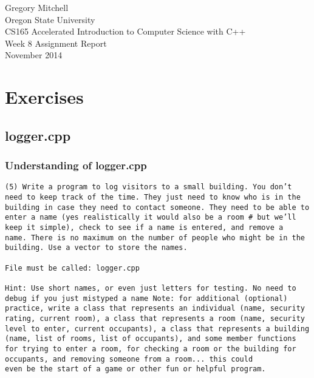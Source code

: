 \documentclass[11pt, oneside]{memoir}
\begin{document}

\begin{center}
  
{\Huge Gregory Mitchell \\
Oregon State University \\ 
CS165 Accelerated Introduction to Computer Science with C++ \\
Week 8 Assignment Report\\
November 2014}
\end{center}
\newpage


\setcounter{tocdepth}{8}
\tableofcontents %
\vspace*{1cm}



\chapter{Exercises}

\section{logger.cpp}

\subsection{Understanding of logger.cpp}

\begin{verbatim}
(5) Write a program to log visitors to a small building. You don’t
need to keep track of the time. They just need to know who is in the
building in case they need to contact someone. They need to be able to
enter a name (yes realistically it would also be a room # but we’ll
keep it simple), check to see if a name is entered, and remove a
name. There is no maximum on the number of people who might be in the
building. Use a vector to store the names.

File must be called: logger.cpp

Hint: Use short names, or even just letters for testing. No need to
debug if you just mistyped a name Note: for additional (optional)
practice, write a class that represents an individual (name, security
rating, current room), a class that represents a room (name, security
level to enter, current occupants), a class that represents a building
(name, list of rooms, list of occupants), and some member functions
for trying to enter a room, for checking a room or the building for
occupants, and removing someone from a room... this could
even be the start of a game or other fun or helpful program.
\end{verbatim}
\end{document}
